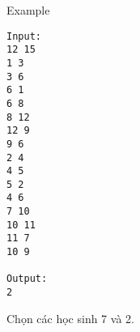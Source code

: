 Example
\begin{verbatim}
Input:
12 15
1 3
3 6
6 1
6 8
8 12
12 9
9 6
2 4
4 5
5 2
4 6
7 10
10 11
11 7
10 9

Output:
2
\end{verbatim}

Chọn các học sinh 7 và 2.